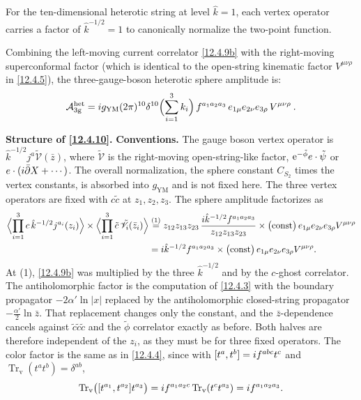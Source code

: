 \noindent For the ten-dimensional heterotic string at level $\hat{k}=1$, each vertex operator carries a factor of $\hat{k}^{-1/2} = 1$ to canonically normalize the two-point function.

Combining the left-moving current correlator \eqref{12.4.9b} with the right-moving superconformal factor (which is identical to the open-string kinematic factor $V^{\mu\nu\rho}$ in \eqref{12.4.5}), the three-gauge-boson heterotic sphere amplitude is:
\begin{equation}
	\mathcal{A}_{3\mathrm{g}}^{\mathrm{het}} = i g_{\mathrm{YM}}(2\pi)^{10}\delta^{10}\Bigl(\sum_{i=1}^3 k_{i}\Bigr)\,f^{a_{1}a_{2}a_{3}}\,e_{1\mu}e_{2\nu}e_{3\rho}\,V^{\mu\nu\rho} \:. \label{12.4.10}
\end{equation}

\begin{tcolorbox}[breakable]
	\begin{remark}
		\textbf{Structure of \eqref{12.4.10}.} \textbf{Conventions.} The gauge boson vertex operator is $\hat k^{-1/2}j^{a}\tilde{\mathscr V}(\bar z)$, where $\tilde{\mathscr V}$ is the right-moving open-string-like factor, $\mathrm{e}^{-\tilde\phi}e\cdot\tilde\psi$ or $e\cdot(i\bar\partial X+\cdots)$. The overall normalization, the sphere constant $C_{S_2}$ times the vertex constants, is absorbed into $g_{\mathrm{YM}}$ and is not fixed here. The three vertex operators are fixed with $c\tilde c$ at $z_{1},z_{2},z_{3}$. The sphere amplitude factorizes as
		\begin{align*}
			\Bigl\langle\prod_{i=1}^{3}c\,\hat k^{-1/2}j^{a_i}(z_{i})\Bigr\rangle\times\Bigl\langle\prod_{i=1}^{3}\tilde c\,\tilde{\mathscr V}_{i}(\bar z_{i})\Bigr\rangle
			&\overset{(1)}{=} z_{12}z_{13}z_{23}\,\frac{i\hat k^{-1/2}f^{a_1a_2a_3}}{z_{12}z_{13}z_{23}}\times\bigl(\text{const}\bigr)\,e_{1\mu}e_{2\nu}e_{3\rho}V^{\mu\nu\rho}\\
			&= i\hat k^{-1/2}f^{a_1a_2a_3}\times\bigl(\text{const}\bigr)\,e_{1\mu}e_{2\nu}e_{3\rho}V^{\mu\nu\rho} .
		\end{align*}
		At (1), \eqref{12.4.9b} was multiplied by the three $\hat k^{-1/2}$ and by the $c$-ghost correlator. The antiholomorphic factor is the computation of \eqref{12.4.3} with the boundary propagator $-2\alpha'\ln|x|$ replaced by the antiholomorphic closed-string propagator $-\frac{\alpha'}{2}\ln\bar z$. That replacement changes only the constant, and the $\bar z$-dependence cancels against $\tilde c\tilde c\tilde c$ and the $\tilde\phi$ correlator exactly as before. Both halves are therefore independent of the $z_{i}$, as they must be for three fixed operators. The color factor is the same as in \eqref{12.4.4}, since with $[t^{a},t^{b}]=i f^{abc}t^{c}$ and $\operatorname{Tr}_{\mathrm{v}}(t^{a}t^{b})=\delta^{ab}$,
		\[
		\operatorname{Tr}_{\mathrm{v}}\bigl([t^{a_1},t^{a_2}]t^{a_3}\bigr)=i f^{a_1a_2c}\operatorname{Tr}_{\mathrm{v}}(t^{c}t^{a_3})=i f^{a_1a_2a_3} .
		\]
	\end{remark}
\end{tcolorbox}

